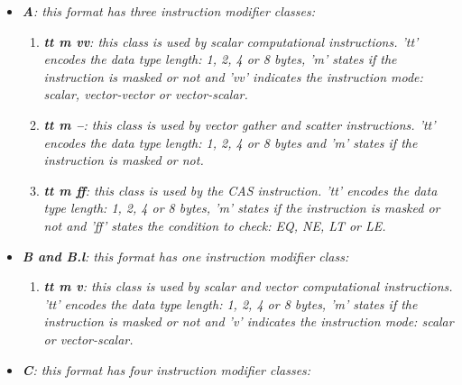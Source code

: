 \documentclass{article}
\begin{document}
            \begin{itemize}

                \item \textit{\textbf{A}: this format has three instruction modifier classes:}

                    \begin{enumerate}

                        \item \textit{\textbf{tt m vv}: this class is used by scalar computational instructions. 'tt' encodes the data type length: 1, 2, 4 or 8 bytes, 'm' states if the instruction is masked or not and 'vv' indicates the instruction mode: scalar, vector-vector or vector-scalar.}

                        \item \textit{\textbf{tt m --}: this class is used by vector gather and scatter instructions. 'tt' encodes the data type length: 1, 2, 4 or 8 bytes and 'm' states if the instruction is masked or not.}

                        \item \textit{\textbf{tt m ff}: this class is used by the CAS instruction. 'tt' encodes the data type length: 1, 2, 4 or 8 bytes, 'm' states if the instruction is masked or not and 'ff' states the condition to check: EQ, NE, LT or LE.}

                    \end{enumerate}

                \item \textit{\textbf{B and B.l}: this format has one instruction modifier class:}

                    \begin{enumerate}

                        \item \textit{\textbf{tt m v}: this class is used by scalar and vector computational instructions. 'tt' encodes the data type length: 1, 2, 4 or 8 bytes, 'm' states if the instruction is masked or not and 'v' indicates the instruction mode: scalar or vector-scalar.}

                    \end{enumerate}

                \item \textit{\textbf{C}: this format has four instruction modifier classes:}

                    \begin{enumerate}


\end{enumerate}
\end{itemize}
\end{document}
